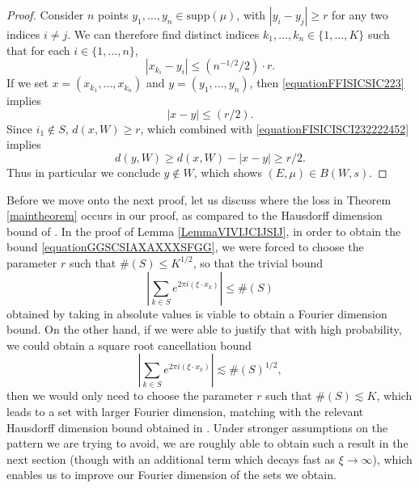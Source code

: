 \documentclass[12pt,reqno]{article}
\numberwithin{equation}{section}
\numberwithin{theorem}{section}
\begin{document}
\begin{proof}
    Consider $n$ points $y_1, \dots, y_n \in \text{supp}(\mu)$, with $|y_i - y_j| \geq r$ for any two indices $i \neq j$. We can therefore find distinct indices $k_1, \dots, k_n \in \{ 1, \dots, K \}$ such that for each $i \in \{ 1, \dots, n \}$,
    \begin{equation} \label{equationFFISICSIC223}
        |x_{k_i} - y_i| \leq (n^{-1/2}/2) \cdot r.
    \end{equation}
    If we set $x = (x_{k_1}, \dots, x_{k_n})$ and $y = (y_1, \dots, y_n)$, then \eqref{equationFFISICSIC223} implies
    \begin{equation} \label{equationFISICISCI232222452}
        |x - y| \leq (r/2).
    \end{equation}
    Since $i_1 \not \in S$, $d(x,W) \geq r$, which combined with \eqref{equationFISICISCI232222452} implies
    \begin{equation} \label{equationSICSICI}
        d(y,W) \geq d(x,W) - |x - y| \geq r/2.
    \end{equation}
    Thus in particular we conclude $y \not \in W$, which shows $(E,\mu) \in B(W,s)$.
\end{proof}

Before we move onto the next proof, let us discuss where the loss in Theorem \ref{maintheorem} occurs in our proof, as compared to the Hausdorff dimension bound of \cite{OurPaper}. In the proof of Lemma \ref{LemmaVIVIJCIJSIJ}, in order to obtain the bound \eqref{equationGGSCSIAXAXXXSFGG}, we were forced to choose the parameter $r$ such that $\#(S) \leq K^{1/2}$, so that the trivial bound
%
\begin{equation}
    \left| \sum_{k \in S} e^{2 \pi i (\xi \cdot x_k)} \right| \leq \#(S)
\end{equation}
%
obtained by taking in absolute values is viable to obtain a Fourier dimension bound. On the other hand, if we were able to justify that with high probability, we could obtain a square root cancellation bound
%
\begin{equation}
    \left| \sum_{k \in S} e^{2 \pi i (\xi \cdot x_k)} \right| \lesssim \#(S)^{1/2},
\end{equation}
%
then we would only need to choose the parameter $r$ such that $\#(S) \lesssim K$, which leads to a set with larger Fourier dimension, matching with the relevant Hausdorff dimension bound obtained in \cite{OurPaper}. Under stronger assumptions on the pattern we are trying to avoid, we are roughly able to obtain such a result in the next section (though with an additional term which decays fast as $\xi \to \infty$), which enables us to improve our Fourier dimension of the sets we obtain.
\end{document}
